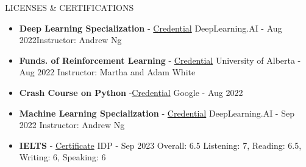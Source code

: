 \documentclass[]{CV}
\begin{document}
\vspace{-4mm}
\begin{section}{LICENSES \& CERTIFICATIONS}
\begin{multicols}{2}
\begin{itemize}
\item {\textbf{Deep Learning Specialization} - \href{https://www.coursera.org/account/accomplishments/specialization/certificate/LGYU3FW9F9AX}{Credential}} \newline DeepLearning.AI - Aug 2022\newline Instructor: Andrew Ng 

\item {\textbf{Funds. of Reinforcement Learning} - \href{https://www.coursera.org/account/accomplishments/certificate/L2QGQYLFC8DL}{Credential}}
\newline University of Alberta - Aug 2022 \newline Instructor: Martha and Adam White
\item {\textbf{Crash Course on Python} -\href{https://www.coursera.org/account/accomplishments/certificate/V9RF53KNW4TS}{Credential}} \newline Google - Aug 2022

\item {\textbf{Machine Learning Specialization} - \href{https://www.coursera.org/account/accomplishments/specialization/certificate/JFDSEZCH8ECY}{Credential}} \newline DeepLearning.AI - Sep 2022 \newline Instructor: Andrew Ng

\item {\textbf{IELTS} - \href{https://drive.google.com/file/d/1vURzbZTJm-i5uOZoTJhUIB3J5qqD2yH4/view?usp=sharing}{Certificate}}
  \newline IDP - Sep 2023 \newline Overall: 6.5 \newline Listening: 7, Reading: 6.5, Writing: 6, Speaking: 6
\end{itemize}
\end{multicols}
\end{section}
\end{document}
